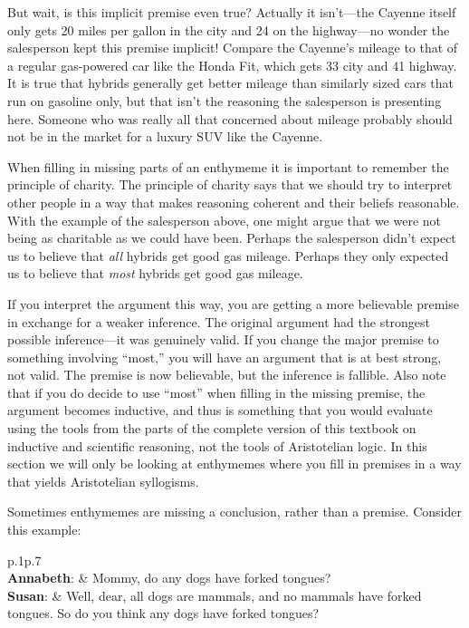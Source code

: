 {But wait, is this implicit premise even true? Actually it isn't---the Cayenne itself only gets 20 miles per gallon in the city and 24 on the highway---no wonder the salesperson kept this premise implicit! Compare the Cayenne's mileage to that of a regular gas-powered car like the Honda Fit, which gets 33 city and 41 highway. It is true that hybrids generally get better mileage than similarly sized cars that run on gasoline only, but that isn't the reasoning the salesperson is presenting here. Someone who was really all that concerned about mileage probably should not be in the market for a luxury SUV like the Cayenne.  

When filling in missing parts of an enthymeme it is important to remember the principle of charity. The principle of charity says that we should try to interpret other people in a way that makes reasoning coherent and their beliefs reasonable. With the example of the salesperson above, one might argue that we were not being as charitable as we could have been. Perhaps the salesperson didn't expect us to believe that \textit{all} hybrids get good gas mileage. Perhaps they only expected us to believe that \textit{most} hybrids get good gas mileage. 

If you interpret the argument this way, you are getting a more believable premise in exchange for a weaker inference. The original argument had the strongest possible inference---it was genuinely valid. If you change the major premise to something involving ``most,'' you will have an argument that is at best strong, not  valid. The premise is now believable, but the inference is fallible.   Also note that if you do decide to use ``most'' when filling in the missing premise, the argument becomes inductive, and thus is something that you would evaluate using the tools from the parts of the complete version of this textbook on inductive and scientific reasoning,  \label{ver_var} not the tools of Aristotelian logic. In this section we will only be looking at enthymemes where you fill in premises in a way that yields Aristotelian syllogisms. 

Sometimes enthymemes are missing a conclusion, rather than a premise. Consider this example:

\begin{tabu}{p{.1\linewidth}p{.7\linewidth}}
\\
\textbf{Annabeth}: & Mommy, do any dogs have forked tongues? \\
\textbf{Susan}:  & Well, dear, all dogs are mammals, and no mammals have forked tongues. So do you think any dogs have forked tongues?\\
\end{tabu}

}
